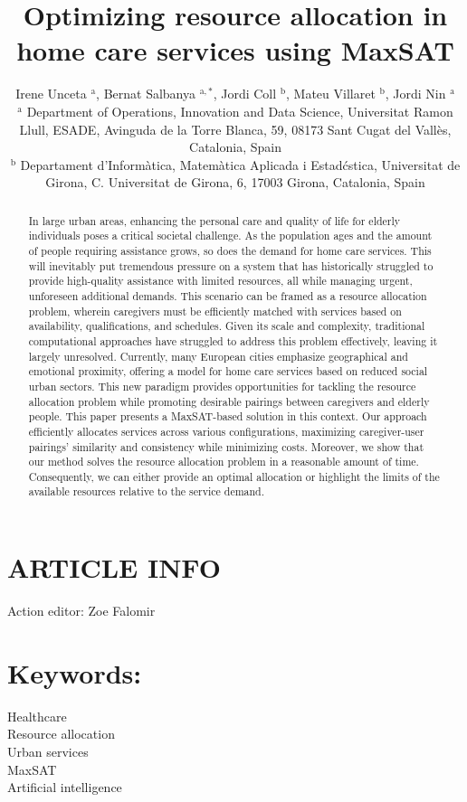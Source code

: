 \documentclass[10pt]{article}
\title{Optimizing resource allocation in home care services using MaxSAT }
\author{Irene Unceta ${ }^{\mathrm{a}}$, Bernat Salbanya ${ }^{\mathrm{a}, *}$, Jordi Coll ${ }^{\mathrm{b}}$, Mateu Villaret ${ }^{\mathrm{b}}$, Jordi Nin ${ }^{\mathrm{a}}$\\
${ }^{\mathrm{a}}$ Department of Operations, Innovation and Data Science, Universitat Ramon Llull, ESADE, Avinguda de la Torre Blanca, 59, 08173 Sant Cugat del Vallès, Catalonia, Spain\\
${ }^{\mathrm{b}}$ Departament d'Informàtica, Matemàtica Aplicada i Estadćstica, Universitat de Girona, C. Universitat de Girona, 6, 17003 Girona, Catalonia, Spain}
\date{}
\begin{document}
\maketitle
\captionsetup{singlelinecheck=false}


\section*{ARTICLE INFO}
Action editor: Zoe Falomir

\section*{Keywords:}
Healthcare\\
Resource allocation\\
Urban services\\
MaxSAT\\
Artificial intelligence

\begin{abstract}
In large urban areas, enhancing the personal care and quality of life for elderly individuals poses a critical societal challenge. As the population ages and the amount of people requiring assistance grows, so does the demand for home care services. This will inevitably put tremendous pressure on a system that has historically struggled to provide high-quality assistance with limited resources, all while managing urgent, unforeseen additional demands. This scenario can be framed as a resource allocation problem, wherein caregivers must be efficiently matched with services based on availability, qualifications, and schedules. Given its scale and complexity, traditional computational approaches have struggled to address this problem effectively, leaving it largely unresolved. Currently, many European cities emphasize geographical and emotional proximity, offering a model for home care services based on reduced social urban sectors. This new paradigm provides opportunities for tackling the resource allocation problem while promoting desirable pairings between caregivers and elderly people. This paper presents a MaxSAT-based solution in this context. Our approach efficiently allocates services across various configurations, maximizing caregiver-user pairings' similarity and consistency while minimizing costs. Moreover, we show that our method solves the resource allocation problem in a reasonable amount of time. Consequently, we can either provide an optimal allocation or highlight the limits of the available resources relative to the service demand.
\end{abstract}
\end{document}
